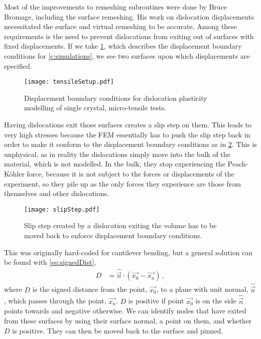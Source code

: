 Most of the improvements to remeshing subroutines were done by Bruce Bromage, including the surface remeshing. His work on dislocation displacements necessitated the surface and virtual remeshing to be accurate. Among these requirements is the need to prevent dislocations from exiting out of surfaces with fixed displacements. If we take \cref{f:tensileSetupTop}, which describes the displacement boundary conditions for \cref{c:simulations}, we see two surfaces upon which displacements are specified.
\begin{figure}
    \centering
    \texttt{[image: tensileSetup.pdf]}
    \caption[Displacement boundary conditions for dislocation plasticity modelling of single crystal, micro-tensile tests.]{Displacement boundary conditions for dislocation plasticity modelling of single crystal, micro-tensile tests.}
    \label{f:tensileSetupTop}
\end{figure}
Having dislocations exit those surfaces creates a slip step on them. This leads to very high stresses because the FEM essentially has to push the slip step back in order to make it conform to the displacement boundary conditions as in \cref{f:slipStep}. This is unphysical, as in reality the dislocations simply move into the bulk of the material, which is not modelled. In the bulk, they stop experiencing the Peach-K\"{o}hler force, because it is not subject to the forces or displacements of the experiment, so they pile up as the only forces they experience are those from themselves and other dislocations.
\begin{figure}
    \centering
    \texttt{[image: slipStep.pdf]}
    \caption{Slip step created by a dislocation exiting the volume has to be moved back to enforce displacement boundary conditions.}
    \label{f:slipStep}
\end{figure}

This was originally hard-coded for cantilever bending, but a general solution can be found with \cref{eq:signedDist},
\begin{align}\label{eq:signedDist}
    D & = \hat{\vec{n}} \cdot (\vec{x_0} - \vec{x_n})\,,
\end{align}
where $D$ is the signed distance from the point, $\vec{x_0}$, to a plane with unit normal, $\hat{\vec{n}}$, which passes through the point, $\vec{x_n}$. $D$ is positive if point $\vec{x_0}$ is on the side $\hat{\vec{n}}$ points towards and negative otherwise. We can identify nodes that have exited from these surfaces by using their surface normal, a point on them, and whether $D$ is positive. They can then be moved back to the surface and pinned.

